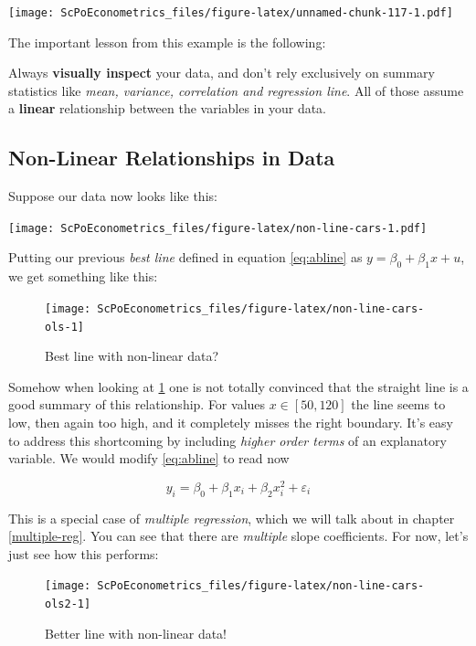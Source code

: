 \documentclass[]{book}
\newenvironment{warning}{\begin{tcolorbox}[colback=orange!5!white,colframe=orange,title=\textbf{Warning!}]}{\end{tcolorbox}}
\theoremstyle{definition}
\theoremstyle{definition}
\theoremstyle{definition}
\theoremstyle{remark}
\begin{document}
\texttt{[image: ScPoEconometrics\_files/figure-latex/unnamed-chunk-117-1.pdf]}

The important lesson from this example is the following:

\begin{warning}
Always \textbf{visually inspect} your data, and don't rely exclusively
on summary statistics like \emph{mean, variance, correlation and
regression line}. All of those assume a \textbf{linear} relationship
between the variables in your data.
\end{warning}

\subsection{Non-Linear Relationships in
Data}\label{non-linear-relationships-in-data}

Suppose our data now looks like this:

\texttt{[image: ScPoEconometrics\_files/figure-latex/non-line-cars-1.pdf]}

Putting our previous \emph{best line} defined in equation
\eqref{eq:abline} as \(y = \beta_0 + \beta_1 x + u\), we get something
like this:

\begin{figure}

{\centering \texttt{[image: ScPoEconometrics\_files/figure-latex/non-line-cars-ols-1]} 

}

\caption{Best line with non-linear data?}\label{fig:non-line-cars-ols}
\end{figure}

Somehow when looking at \ref{fig:non-line-cars-ols} one is not totally
convinced that the straight line is a good summary of this relationship.
For values \(x\in[50,120]\) the line seems to low, then again too high,
and it completely misses the right boundary. It's easy to address this
shortcoming by including \emph{higher order terms} of an explanatory
variable. We would modify \eqref{eq:abline} to read now

\[
y_i = \beta_0 + \beta_1 x_i + \beta_2 x_i^2 + \varepsilon_i \label{eq:abline2}
\]

This is a special case of \emph{multiple regression}, which we will talk
about in chapter \ref{multiple-reg}. You can see that there are
\emph{multiple} slope coefficients. For now, let's just see how this
performs:

\begin{figure}

{\centering \texttt{[image: ScPoEconometrics\_files/figure-latex/non-line-cars-ols2-1]} 

}

\caption{Better line with non-linear data!}\label{fig:non-line-cars-ols2}
\end{figure}
\end{document}
